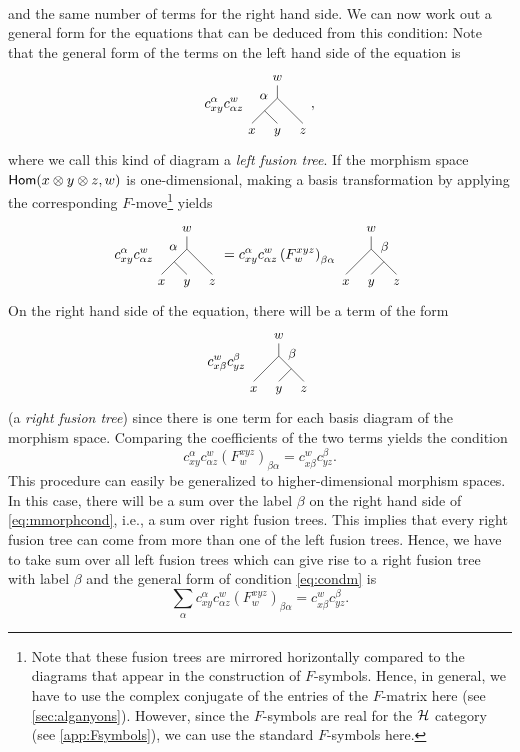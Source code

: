 {{{\begin{align}
	\end{align}
and the same number of terms for the right hand side. We can now work out a general form for the equations that can be deduced from this condition: Note that the general form of the terms on the left hand side of the equation is
	\begin{equation}
		c_{xy}^\alpha c_{\alpha z}^w\fuselefttree{x}{y}{\alpha}{z}{w},		
	\end{equation}
where we call this kind of diagram a \emph{left fusion tree}. If the morphism space $\mathsf{Hom}(x\otimes y\otimes z,w)$ is one-dimensional, making a basis transformation by applying the corresponding $F$-move\footnote{Note that these fusion trees are mirrored horizontally compared to the diagrams that appear in the construction of $F$-symbols. Hence, in general, we have to use the complex conjugate of the entries of the $F$-matrix here (see \cref{sec:alganyons}). However, since the $F$-symbols are real for the ${\mathcal{H}}$ category (see \cref{app:Fsymbols}), we can use the standard $F$-symbols here.} yields
	\begin{equation}
	\label{eq:mmorphcond}
		c_{xy}^\alpha c_{\alpha z}^w\fuselefttree{x}{y}{\alpha}{z}{w}=c_{xy}^\alpha c_{\alpha z}^w\left(F_w^{xyz}\right)_{\beta\alpha}\fuserighttree{x}{y}{\beta}{z}{w}
	\end{equation}
On the right hand side of the equation, there will be a term of the form
	\begin{equation}
		c_{x\beta}^w c_{y z}^\beta\fuserighttree{x}{y}{\beta}{z}{w}
	\end{equation}
(a \emph{right fusion tree}) since there is one term for each basis diagram of the morphism space. Comparing the coefficients of the two terms yields the condition
	\begin{equation}
	\label{eq:condm}
		c_{xy}^\alpha c_{\alpha z}^w\left(F_w^{xyz}\right)_{\beta\alpha}=c_{x\beta}^w c_{y z}^\beta.
	\end{equation}
This procedure can easily be generalized to higher-dimensional morphism spaces. In this case, there will be a sum over the label $\beta$ on the right hand side of \cref{eq:mmorphcond}, i.e., a sum over right fusion trees. This implies that every right fusion tree can come from more than one of the left fusion trees. Hence, we have to take sum over all left fusion trees which can give rise to a right fusion tree with label $\beta$ and the general form of condition \cref{eq:condm} is
	\begin{equation}
 		\sum_\alpha c_{xy}^\alpha c_{\alpha z}^w\left(F_w^{xyz}\right)_{\beta\alpha}=c_{x\beta}^w c_{y z}^\beta.

\end{equation}}}}
